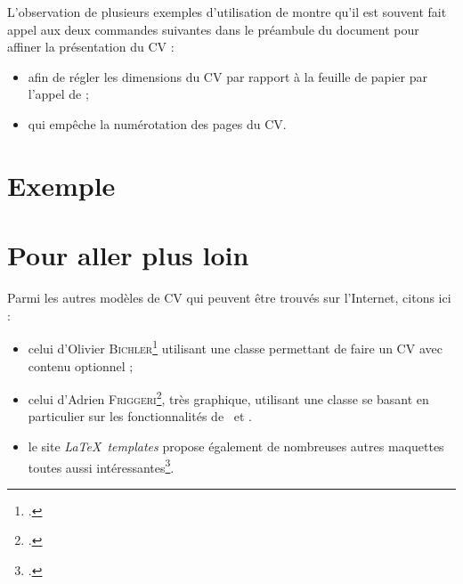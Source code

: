 L'observation de plusieurs exemples d'utilisation de  montre qu'il est souvent fait appel aux deux commandes suivantes dans le préambule du document pour affiner la présentation du CV :
\begin{itemize}
\item {} afin de régler les dimensions du CV par rapport à la feuille de papier par l'appel de  ;
\item {} qui empêche la numérotation des pages du CV.
\end{itemize}


\section{Exemple}



\section{Pour aller plus loin}

Parmi les autres modèles de CV qui peuvent être trouvés sur l'Internet, citons ici :
\begin{itemize}
\item celui d'Olivier \textsc{Bichler}\footnote{.} utilisant une classe permettant de faire un CV avec contenu optionnel ;
\item celui d'Adrien \textsc{Friggeri}\footnote{.}, très graphique, utilisant une classe se basant en particulier sur les fonctionnalités de \XeLaTeX\ et .
\item le site \emph{\LaTeX\ templates}\cite{temp} propose également de nombreuses autres maquettes toutes aussi intéressantes\footnote{.}.
\end{itemize}
